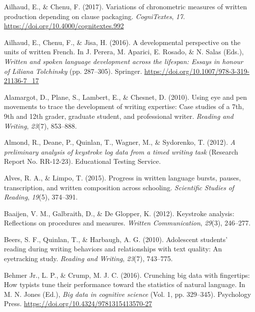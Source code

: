 \documentclass[
  man,floatsintext]{apa7}
\newlength{\cslhangindent}
\newlength{\cslentryspacingunit} %
\newenvironment{CSLReferences}[2] %
 {%
  \setlength{\parindent}{0pt}
  \ifodd #1
  \let\oldpar\par
  \def\par{\hangindent=\cslhangindent\oldpar}
  \fi
  \setlength{\parskip}{#2\cslentryspacingunit}
 }%
 {}
\begin{document}
\newpage

\hypertarget{refs}{}
\begin{CSLReferences}{1}{0}
\leavevmode{}%
Ailhaud, E., \& Chenu, F. (2017). Variations of chronometric measures of written production depending on clause packaging. \emph{CogniTextes}, \emph{17}. \url{https://doi.org/10.4000/cognitextes.992}

\leavevmode{}%
Ailhaud, E., Chenu, F., \& Jisa, H. (2016). A developmental perspective on the units of written {F}rench. In J. Perera, M. Aparici, E. Rosado, \& N. Salas (Eds.), \emph{Written and spoken language development across the lifespan: Essays in honour of {Liliana Tolchinsky}} (pp. 287--305). Springer. \url{https://doi.org/10.1007/978-3-319-21136-7_17}

\leavevmode{}%
Alamargot, D., Plane, S., Lambert, E., \& Chesnet, D. (2010). Using eye and pen movements to trace the development of writing expertise: Case studies of a 7th, 9th and 12th grader, graduate student, and professional writer. \emph{Reading and Writing}, \emph{23}(7), 853--888.

\leavevmode{}%
Almond, R., Deane, P., Quinlan, T., Wagner, M., \& Sydorenko, T. (2012). \emph{A preliminary analysis of keystroke log data from a timed writing task} (Research Report No. RR-12-23). Educational Testing Service.

\leavevmode{}%
Alves, R. A., \& Limpo, T. (2015). Progress in written language bursts, pauses, transcription, and written composition across schooling. \emph{Scientific Studies of Reading}, \emph{19}(5), 374--391.

\leavevmode{}%
Baaijen, V. M., Galbraith, D., \& De Glopper, K. (2012). Keystroke analysis: Reflections on procedures and measures. \emph{Written Communication}, \emph{29}(3), 246--277.

\leavevmode{}%
Beers, S. F., Quinlan, T., \& Harbaugh, A. G. (2010). Adolescent students' reading during writing behaviors and relationships with text quality: An eyetracking study. \emph{Reading and Writing}, \emph{23}(7), 743--775.

\leavevmode{}%
Behmer Jr., L. P., \& Crump, M. J. C. (2016). Crunching big data with fingertips: How typists tune their performance toward the statistics of natural language. In M. N. Jones (Ed.), \emph{Big data in cognitive science} (Vol. 1, pp. 329--345). Psychology Press. \url{https://doi.org/10.4324/9781315413570-27}


\end{CSLReferences}
\end{document}
